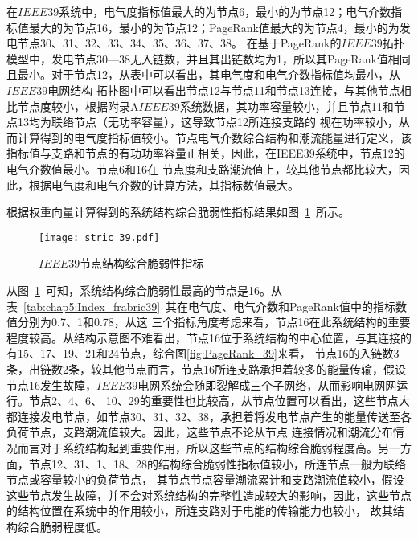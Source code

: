 在$IEEE39$系统中，电气度指标值最大的为节点6，最小的为节点12；电气介数指标值最大的为节点16，最小的为节点12；PageRank值最大的为节点4，最小的为发电节点30、31、32、33、34、35、36、37、38。
在基于PageRank的$IEEE39$拓扑模型中，发电节点30—38无入链数，并且其出链数均为1，所以其PageRank值相同且最小。对于节点12，从表中可以看出，其电气度和电气介数指标值均最小，从$IEEE39$电网结构
拓扑图中可以看出节点12与节点11和节点13连接，与其他节点相比节点度较小，根据附录A$IEEE39$系统数据，其功率容量较小，并且节点11和节点13均为联络节点（无功率容量），这导致节点12所连接支路的
视在功率较小，从而计算得到的电气度指标值较小。节点电气介数综合结构和潮流能量进行定义，该指标值与支路和节点的有功功率容量正相关，因此，在IEEE39系统中，节点12的电气介数值最小。节点6和16在
节点度和支路潮流值上，较其他节点都比较大，因此，根据电气度和电气介数的计算方法，其指标数值最大。

根据权重向量计算得到的系统结构综合脆弱性指标结果如图~\ref{fig:stric_39}~所示。
\begin{figure}[H] %
  \centering
  \texttt{[image: stric\_39.pdf]}
  \caption{$IEEE39$节点结构综合脆弱性指标}
  \label{fig:stric_39}
\end{figure}

从图~\ref{fig:stric_39}~可知，系统结构综合脆弱性最高的节点是16。从表~\ref{tab:chap5:Index_frabric39}~其在电气度、电气介数和PageRank值中的指标数值分别为0.7、1和0.78，从这
三个指标角度考虑来看，节点16在此系统结构的重要程度较高。从结构示意图不难看出，节点16位于系统结构的中心位置，与其连接的有15、17、19、21和24节点，综合图\ref{fig:PageRank_39}来看，
节点16的入链数3条，出链数2条，较其他节点而言，节点16所连支路承担着较多的能量传输，假设节点16发生故障，$IEEE39$电网系统会随即裂解成三个子网络，从而影响电网网运行。节点2、4、6、
10、29的重要性也比较高，从节点位置可以看出，这些节点大都连接发电节点，如节点30、31、32、38，承担着将发电节点产生的能量传送至各负荷节点，支路潮流值较大。因此，这些节点不论从节点
连接情况和潮流分布情况而言对于系统结构起到重要作用，所以这些节点的结构综合脆弱程度高。另一方面，节点12、31、1、18、28的结构综合脆弱性指标值较小，所连节点一般为联络节点或容量较小的负荷节点，
其节点节点容量潮流累计和支路潮流值较小，假设这些节点发生故障，并不会对系统结构的完整性造成较大的影响，因此，这些节点的结构位置在系统中的作用较小，所连支路对于电能的传输能力也较小，
故其结构综合脆弱程度低。

